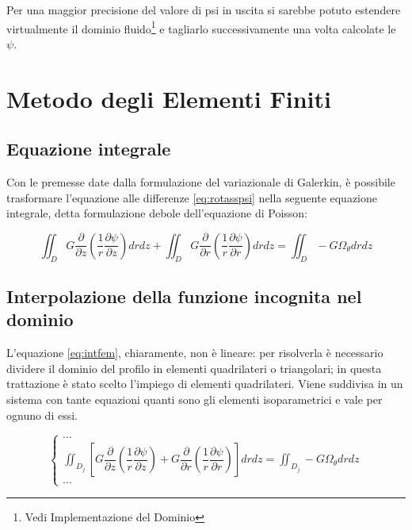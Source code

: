 \documentclass{tufte-handout}
\newcommand{\de}[2]{\dfrac{\partial #1}{\partial #2}}
\begin{document}
Per una maggior precisione del valore di psi in uscita si sarebbe potuto estendere virtualmente il dominio fluido\footnote{Vedi Implementazione del Dominio} e tagliarlo successivamente una volta calcolate le $\psi$.

\section{Metodo degli Elementi Finiti}


\subsection{Equazione integrale}
Con le premesse date dalla formulazione del variazionale di Galerkin, è possibile trasformare l'equazione alle differenze \ref{eq:rotasspsi} nella seguente equazione integrale, detta formulazione debole dell'equazione di Poisson:
\begin{fullwidth}
\begin{equation}
     \iint_{D} G\de{}{z}\left(\frac{1}{r}\de{\psi}{z}\right) dr dz
    + \iint_{D} G\de{}{r}\left(\frac{1}{r}\de{\psi}{r}\right) dr dz
    = \iint_{D} -G\Omega_\theta dr dz
    \label{eq:intfem}
\end{equation}
\end{fullwidth}

\subsection{Interpolazione della funzione incognita nel dominio}
L'equazione \ref{eq:intfem}, chiaramente, non è lineare: per risolverla è necessario dividere il dominio del profilo in elementi quadrilateri o triangolari; in questa trattazione è stato scelto l'impiego di elementi quadrilateri. Viene suddivisa in un sistema con tante equazioni quanti sono gli elementi isoparametrici e vale per ognuno di essi.
\begin{fullwidth}
\[\begin{cases}
    ...\\
     \iint_{D_j} \left[G\de{}{z}\left(\dfrac{1}{r}\de{\psi}{z}\right) 
    + G\de{}{r}\left(\dfrac{1}{r}\de{\psi}{r}\right)\right] dr dz
    = \iint_{D_j} -G\Omega_\theta dr dz \\
    ...
\end{cases}
\]
\end{fullwidth}
\end{document}

